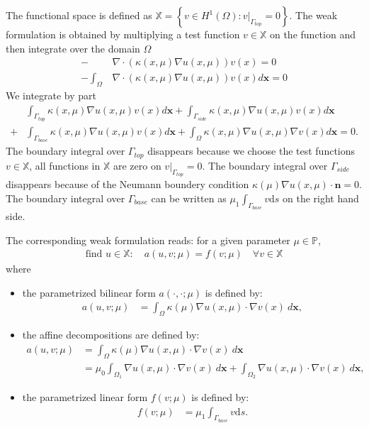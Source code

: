 The functional space is defined as $\mathbb{X} = \left\{ v \in H^1(\Omega): v|_{\Gamma_{top}} = 0 \right\}$.
The weak formulation is obtained by multiplying a test function $v\in \mathbb{X}$ on the function and then integrate over the domain $\Omega$
\begin{align*}
	-&\nabla \cdot (\kappa(x,\mu)\nabla u(x,\mu)) v(x) = 0\\
	-\int_{\Omega} &\nabla \cdot (\kappa(x,\mu)\nabla u(x,\mu)) v(x) d\boldsymbol{x} = 0
\end{align*}
We integrate by part
\begin{align*}
	&\int_{\Gamma_{top}} \kappa(x,\mu)\nabla u(x,\mu) v(x) d\boldsymbol{x}
	+
	\int_{\Gamma_{side}} \kappa(x,\mu)\nabla u(x,\mu) v(x) d\boldsymbol{x}\\
	+
	&\int_{\Gamma_{base}} \kappa(x,\mu)\nabla u(x,\mu) v(x) d\boldsymbol{x}
	+
	\int_{\Omega} \kappa(x,\mu)\nabla u(x,\mu) \nabla v(x) d\boldsymbol{x} = 0.
\end{align*}
The boundary integral over $\Gamma_{top}$ disappears because we choose the test functions $v \in \mathbb{X}$, all functions in $\mathbb{X}$ are zero on $v|_{\Gamma_{top}} = 0$.
The boundary integral over $\Gamma_{side}$ disappears because of the Neumann boundery condition $\kappa(\mu)\nabla u(x,\mu)\cdot \mathbf{n} = 0$.
The boundary integral over $\Gamma_{base}$ can be written as $\mu_1 \int_{\Gamma_{base}} v \text{d}s$ on the right hand side.

The corresponding weak formulation reads:
for a given parameter $\mu\in\mathbb{P}$,
\begin{align*}
\text{find }u \in \mathbb{X} :\quad a\left(u,v;\mu\right) = f(v;\mu) \quad \forall v\in\mathbb{X}
\end{align*}
where
\begin{itemize}
	\item the parametrized bilinear form $a(\cdot, \cdot; \mu)$ is defined by:
	\begin{align*}
		a(u, v;\mu)
		&=\int_{\Omega} \kappa(\mu)\nabla u(x,\mu)\cdot \nabla v(x) \ d\boldsymbol{x} ,
	\end{align*}
	\item the affine decompositions are defined by:
	\begin{align*}
		a(u, v;\mu)
		&=\int_{\Omega} \kappa(\mu)\nabla  u(x,\mu)\cdot \nabla v(x) \ d\boldsymbol{x} \\
		&= \mu_0 \int_{\Omega_1} \nabla u(x,\mu)\cdot \nabla v(x) \ d\boldsymbol{x} 
		+ \int_{\Omega_2} \nabla u(x,\mu)\cdot \nabla v(x) \ d\boldsymbol{x} ,
	\end{align*}
	
	\item the parametrized linear form $f(v;\mu)$ is defined by:
	\begin{align*}
	f(v;\mu) &= \mu_1 \int_{\Gamma_{base}} v \text{d}s.
	\end{align*}

\end{itemize}

